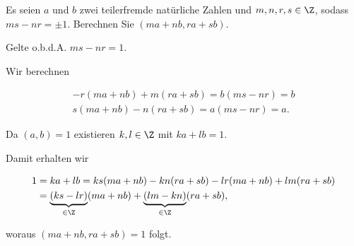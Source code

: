 
\begin{exercise}

Es seien $a$ und $b$ zwei teilerfremde natürliche Zahlen und $m,n,r,s \in \Z$,
sodass $ms - nr = \pm 1$. Berechnen Sie $(ma + nb, ra + sb)$.

\end{exercise}


\begin{solution}
Gelte o.b.d.A. $ms - nr = 1$.

Wir berechnen 

\begin{align*}
    -r(ma + nb) + m(ra + sb) = b(ms - nr) = b \\
    s(ma + nb) - n(ra + sb) = a(ms - nr) = a.
\end{align*}

Da $(a,b) = 1$ existieren $k, l \in \Z$ mit $ka + lb = 1$.

Damit erhalten wir

\begin{align*}
    1 &= ka + lb = ks(ma + nb) - kn(ra + sb) - lr(ma + nb) + lm(ra + sb) \\
    &= \underbrace{(ks - lr)}_{\in \Z}(ma + nb) + 
        \underbrace{(lm - kn)}_{\in \Z}(ra + sb),
\end{align*}

woraus $(ma + nb, ra + sb) = 1$ folgt.

\end{solution}

